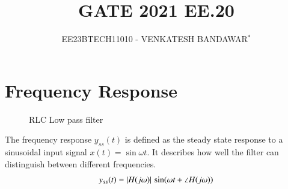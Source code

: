 \documentclass[journal,12pt,twocolumn]{IEEEtran}
\theoremstyle{remark}
\begin{document}

\vspace{3cm}

\title{GATE 2021 EE.20}
\author{EE23BTECH11010 - VENKATESH BANDAWAR$^{*}$%
}
\maketitle
\newpage
\bigskip

\section{Frequency Response}
\begin{figure}[!ht]
    \centering
    
    \caption{RLC Low pass filter}
\end{figure}
The frequency response $y_{ss}(t)$ is defined as the steady state response to a sinusoidal input signal $x(t) = \sin{\omega t}$. It describes how well the filter can distinguish between different frequencies.
\begin{align}
y_{ss}(t)=\left\vert H(j\omega)\right\vert\,\sin(\omega t+\angle H(j\omega))
\end{align}
\end{document}
